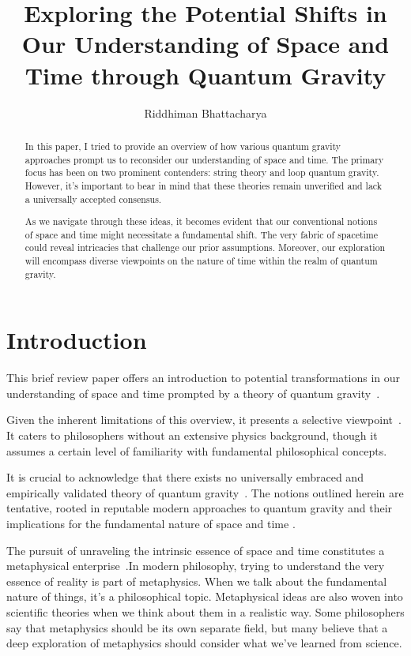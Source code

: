 \documentclass[11pt]{article}
\title{\textbf{\Huge Exploring the Potential Shifts in Our Understanding of Space and Time through Quantum Gravity}}
\author{Riddhiman Bhattacharya}
\begin{document}
\maketitle
\Large
\begin{abstract}
In this paper, I tried to provide an overview of how various quantum gravity approaches prompt us to reconsider our understanding of space and time. The primary focus has been on two prominent contenders: string theory and loop quantum gravity. However, it's important to bear in mind that these theories remain unverified and lack a universally accepted consensus.

As we navigate through these ideas, it becomes evident that our conventional notions of space and time might necessitate a fundamental shift. The very fabric of spacetime could reveal intricacies that challenge our prior assumptions. Moreover, our exploration will encompass diverse viewpoints on the nature of time within the realm of quantum gravity.
\end{abstract}



\section*{Introduction}
This brief review paper offers an introduction to potential transformations in our understanding of space and time prompted by a theory of quantum gravity~\cite{butterfield2011aemergence,dieks2015emergence,barbour2000end}.

Given the inherent limitations of this overview, it presents a selective viewpoint~\cite{henson2012causal}. It caters to philosophers without an extensive physics background, though it assumes a certain level of familiarity with fundamental philosophical concepts.

It is crucial to acknowledge that there exists no universally embraced and empirically validated theory of quantum gravity~\cite{polchinski1998string}. The notions outlined herein are tentative, rooted in reputable modern approaches to quantum gravity and their implications for the fundamental nature of space and time \cite{becker2006string}.

The pursuit of unraveling the intrinsic essence of space and time constitutes a metaphysical enterprise~\cite{rickles2013dual,rickles2011philosopher,rickles2008quantum}.In modern philosophy, trying to understand the very essence of reality is part of metaphysics. When we talk about the fundamental nature of things, it's a philosophical topic. Metaphysical ideas are also woven into scientific theories when we think about them in a realistic way. Some philosophers say that metaphysics should be its own separate field, but many believe that a deep exploration of metaphysics should consider what we've learned from science.
\end{document}
